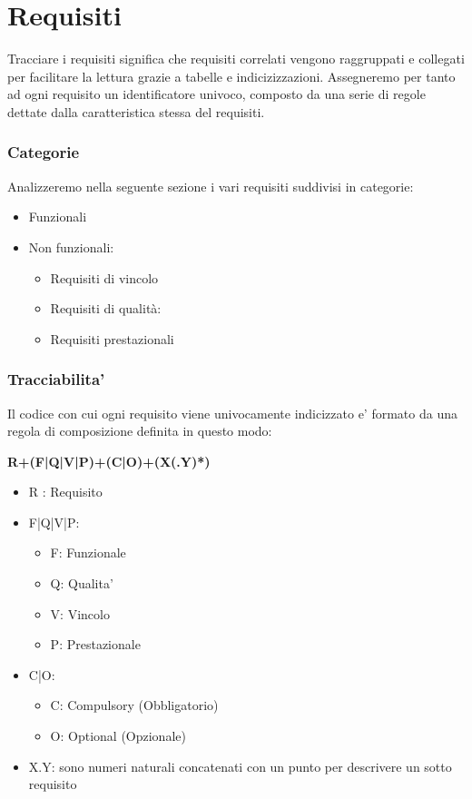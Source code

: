 
\section{Requisiti}
    Tracciare i requisiti significa che requisiti correlati vengono raggruppati e collegati per facilitare la lettura grazie a tabelle e indicizizzazioni.
    Assegneremo per tanto ad ogni requisito un identificatore univoco, composto da una serie di regole dettate dalla caratteristica stessa del requisiti.
    
    \subsubsection{Categorie}
    Analizzeremo nella seguente sezione i vari requisiti suddivisi in categorie:
    \begin{itemize}
        \item Funzionali
        \item Non funzionali:
            \begin{itemize}
                \item Requisiti di vincolo
                \item Requisiti di qualità:
                \item Requisiti prestazionali
            \end{itemize}
    \end{itemize}
    
    \subsubsection{Tracciabilita'}
    Il codice con cui ogni requisito viene univocamente indicizzato e' formato da una regola di composizione definita in questo modo:
    \newline
    
    \begin{center}
        \textbf{R+(F|Q|V|P)+(C|O)+(X(.Y)*)}    
    \end{center}
    
    
    \begin{itemize}
        \item R : Requisito
        \item F|Q|V|P:
            \begin{itemize}
                \item F: Funzionale
                \item Q: Qualita'
                \item V: Vincolo
                \item P: Prestazionale
            \end{itemize}
        \item C|O:
            \begin{itemize}
                \item C: Compulsory (Obbligatorio)
                \item O: Optional (Opzionale)
            \end{itemize}
        \item X.Y: sono numeri naturali concatenati con un punto per descrivere un sotto requisito
    \end{itemize}
    
